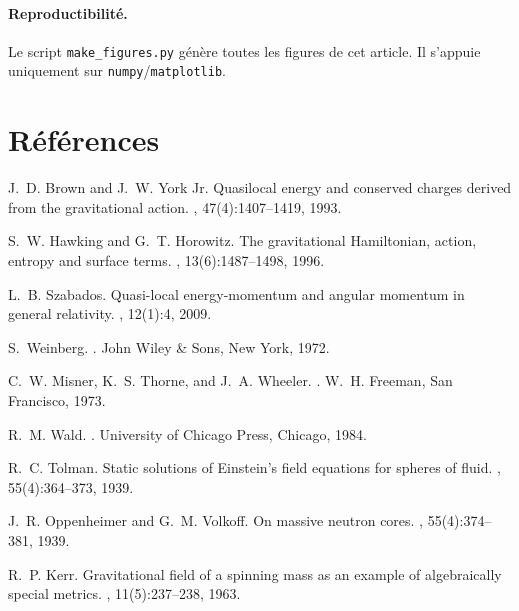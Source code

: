 \documentclass[11pt]{article}
\begin{document}
\paragraph{Reproductibilit\'e.}
Le script \texttt{make\_figures.py} g\'en\`ere toutes les figures de cet article. Il s'appuie uniquement sur \texttt{numpy}/\texttt{matplotlib}.

\section*{R\'ef\'erences}

\begin{thebibliography}{10}

J.~D. Brown and J.~W. York Jr.
\newblock Quasilocal energy and conserved charges derived from the gravitational action.
, 47(4):1407--1419, 1993.

S.~W. Hawking and G.~T. Horowitz.
\newblock The gravitational Hamiltonian, action, entropy and surface terms.
, 13(6):1487--1498, 1996.

L.~B. Szabados.
\newblock Quasi-local energy-momentum and angular momentum in general relativity.
, 12(1):4, 2009.

S.~Weinberg.
.
\newblock John Wiley \& Sons, New York, 1972.

C.~W. Misner, K.~S. Thorne, and J.~A. Wheeler.
.
\newblock W.~H. Freeman, San Francisco, 1973.

R.~M. Wald.
.
\newblock University of Chicago Press, Chicago, 1984.

R.~C. Tolman.
\newblock Static solutions of Einstein's field equations for spheres of fluid.
, 55(4):364--373, 1939.

J.~R. Oppenheimer and G.~M. Volkoff.
\newblock On massive neutron cores.
, 55(4):374--381, 1939.

R.~P. Kerr.
\newblock Gravitational field of a spinning mass as an example of algebraically special metrics.
, 11(5):237--238, 1963.


\end{thebibliography}
\end{document}
